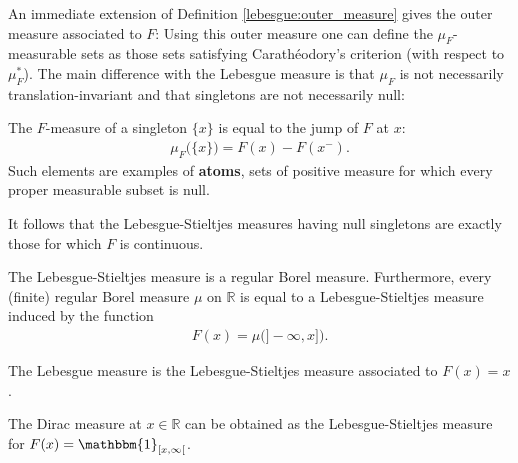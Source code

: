     An immediate extension of Definition \ref{lebesgue:outer_measure} gives the outer measure associated to $F$:
    Using this outer measure one can define the $\mu_F$-measurable sets as those sets satisfying Carath\'eodory's criterion (with respect to $\mu_F^*$). The main difference with the Lebesgue measure is that $\mu_F$ is not necessarily translation-invariant and that singletons are not necessarily null:
    \begin{property}[Singletons]
        The $F$-measure of a singleton $\{x\}$ is equal to the jump of $F$ at $x$:
        \begin{gather}
            \mu_F\big(\{x\}\big) = F(x) - F(x^-).
        \end{gather}
        Such elements are examples of \textbf{atoms}, sets of positive measure for which every proper measurable subset is null.
    \end{property}
    \begin{result}
        It follows that the Lebesgue-Stieltjes measures having null singletons are exactly those for which $F$ is continuous.
    \end{result}

    \begin{property}[Regularity]
        The Lebesgue-Stieltjes measure is a regular Borel measure. Furthermore, every (finite) regular Borel measure $\mu$ on $\mathbb{R}$ is equal to a Lebesgue-Stieltjes measure induced by the function
        \begin{gather}
            F(x) = \mu\big(]-\!\infty,x]\big).
        \end{gather}
    \end{property}

    \begin{example}
        The Lebesgue measure is the Lebesgue-Stieltjes measure associated to $F(x)=x$.
    \end{example}
    \begin{example}
        The Dirac measure at $x\in\mathbb{R}$ can be obtained as the Lebesgue-Stieltjes measure for $F(x)=\mathbbm{1}_{[x,\infty[}$.
    \end{example}

